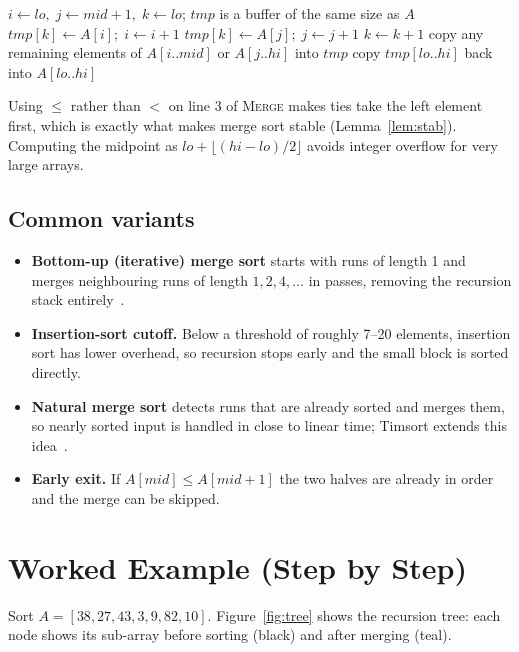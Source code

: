\documentclass[11pt,a4paper]{article}
\theoremstyle{plain}
\theoremstyle{definition}
\begin{document}
\begin{algorithm}[!ht]
\caption{\textsc{Merge}$(A,lo,mid,hi)$}
\begin{algorithmic}[1]
\State $i\gets lo,\; j\gets mid+1,\; k\gets lo$; \; $tmp$ is a buffer of the same size as $A$
    \State $tmp[k]\gets A[i];\; i\gets i+1$
  \Else
    \State $tmp[k]\gets A[j];\; j\gets j+1$
  \EndIf
  \State $k\gets k+1$
\EndWhile
\State copy any remaining elements of $A[i..mid]$ or $A[j..hi]$ into $tmp$
\State copy $tmp[lo..hi]$ back into $A[lo..hi]$
\end{algorithmic}
\end{algorithm}

Using $\le$ rather than $<$ on line 3 of \textsc{Merge} makes ties take the left element first, which is exactly what makes merge sort stable (Lemma~\ref{lem:stab}). Computing the midpoint as $lo+\lfloor(hi-lo)/2\rfloor$ avoids integer overflow for very large arrays.

\subsection{Common variants}
\begin{itemize}
  \item \textbf{Bottom-up (iterative) merge sort} starts with runs of length 1 and merges neighbouring runs of length $1,2,4,\dots$ in passes, removing the recursion stack entirely~\cite{sedgewick}.
  \item \textbf{Insertion-sort cutoff.} Below a threshold of roughly 7--20 elements, insertion sort has lower overhead, so recursion stops early and the small block is sorted directly.
  \item \textbf{Natural merge sort} detects runs that are already sorted and merges them, so nearly sorted input is handled in close to linear time; Timsort extends this idea~\cite{peters}.
  \item \textbf{Early exit.} If $A[mid]\le A[mid+1]$ the two halves are already in order and the merge can be skipped.
\end{itemize}

\section{Worked Example (Step by Step)}\label{sec:example}
Sort $A=[38,27,43,3,9,82,10]$. Figure~\ref{fig:tree} shows the recursion tree: each node shows its sub-array before sorting (black) and after merging (teal).
\end{document}
